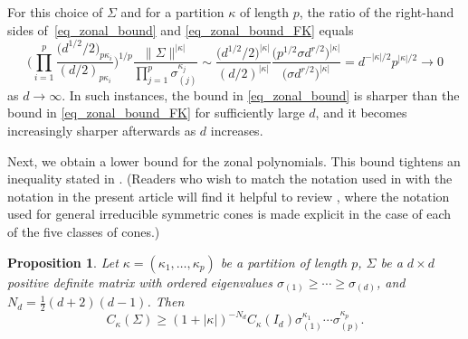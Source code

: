 \documentclass[pdftex]{sigma}
\numberwithin{equation}{section}
\newtheorem{Proposition}[Theorem]{Proposition}
 { \theoremstyle{definition}
\newtheorem{Definition}[Theorem]{Definition}
\newtheorem{Note}[Theorem]{Note}
\newtheorem{Example}[Theorem]{Example}
\newtheorem{Remark}[Theorem]{Remark} }
\begin{document}
\begin{Remark}
{For this choice of $\Sigma$ and for a partition $\kappa$ of length $p$, the ratio of the right-hand sides of~\eqref{eq_zonal_bound} and \eqref{eq_zonal_bound_FK} equals
\[
\Bigg(\prod_{i=1}^p \frac{\bigl(d^{1/2}/2\bigr)_{p \kappa_i}}{(d/2)_{p \kappa_i}}\Bigg)^{1/p} \frac{\|\Sigma\|^{|\kappa|}}{\prod_{j=1}^p \sigma_{(j)}^{\kappa_j}} \sim \frac{\bigl(d^{1/2}/2\bigr)^{|\kappa|}}{(d/2)^{|\kappa|}} \frac{\bigl(p^{1/2} \sigma d^{r/2}\bigr)^{|\kappa|}}{\bigl(\sigma d^{r/2}\bigr)^{|\kappa|}} =
d^{-|\kappa|/2} p^{|\kappa|/2} \to 0
\]
as $d \to \infty$. In such instances, the bound in \eqref{eq_zonal_bound} is sharper than the bound in \eqref{eq_zonal_bound_FK} for sufficiently large $d$, and it becomes increasingly sharper afterwards as $d$ increases.
}\end{Remark}



Next, we obtain a lower bound for the zonal polynomials. This bound tightens an inequality stated in \cite[Theorem XII.1.1\,(ii)]{FarautKoranyi}. (Readers who wish to match the notation used in \cite{FarautKoranyi} with the notation in the present article will find it helpful to review \cite[Section 1.12]{DingGrossRichards}, where the notation used for general irreducible symmetric cones is made explicit in the case of each of the five classes of cones.)

\begin{Proposition}
\label{prop_zonal_lower_bound}
Let $\kappa = (\kappa_1,\ldots,\kappa_p)$ be a partition of length $p$, $\Sigma$ be a $d \times d$ positive definite matrix with ordered eigenvalues $\sigma_{(1)} \ge \cdots \ge \sigma_{(d)}$, and $N_d = \tfrac12(d+2)(d-1)$. Then
\begin{equation}
\label{eq_zonal_ineq_lb}
C_\kappa(\Sigma) \ge (1 + |\kappa|)^{-N_d} C_\kappa(I_d) \sigma_{(1)}^{\kappa_1} \cdots \sigma_{(p)}^{\kappa_p}.
\end{equation}
\end{Proposition}
\end{document}
